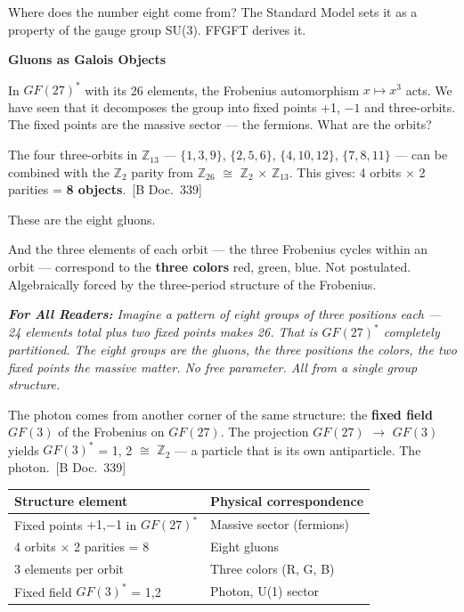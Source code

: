 \documentclass[11pt,oneside]{book}
\newcommand{\status}[1]{\penalty10000\,{\scriptsize\textcolor{gray!60}{[#1]}}}
\newenvironment{laierspur}{%
  \par\vspace{4pt}%
  \noindent\small\itshape\color{blue!60!black}%
  \textbf{For All Readers:}\enspace\ignorespaces}{%
  \par\vspace{4pt}\normalsize\normalfont\normalcolor}
\begin{document}
Where does the number eight come from? The Standard Model sets it as a
property of the gauge group SU(3). FFGFT derives it.

\textbf{Gluons as Galois Objects}

In $GF(27)^*$ with its 26 elements, the Frobenius automorphism $x \mapsto x^3$ acts.
We have seen that it decomposes the group into fixed points {+1, $-1$} and
three-orbits. The fixed points are the massive sector — the fermions. What
are the orbits?

The four three-orbits in $\mathbb{Z}_{13}$ — $\{1,3,9\}$, $\{2,5,6\}$, $\{4,10,12\}$, $\{7,8,11\}$
— can be combined with the $\mathbb{Z}_2$ parity from $\mathbb{Z}_{26}$ $\cong$ $\mathbb{Z}_2$ $\times$ $\mathbb{Z}_{13}$.
This gives: 4 orbits $\times$ 2 parities = \textbf{8 objects}. \status{B Doc.~339}

These are the eight gluons.

And the three elements of each orbit — the three Frobenius cycles within
an orbit — correspond to the \textbf{three colors} red, green, blue. Not
postulated. Algebraically forced by the three-period structure of the
Frobenius.

\begin{laierspur}
Imagine a pattern of eight groups of three positions each — 24 elements
total plus two fixed points makes 26. That is $GF(27)^*$ completely
partitioned. The eight groups are the gluons, the three positions the
colors, the two fixed points the massive matter. No free parameter. All from
a single group structure.
\end{laierspur}

The photon comes from another corner of the same structure: the \textbf{fixed
field $GF(3)$} of the Frobenius on $GF(27)$. The projection $GF(27)$ $\to$ $GF(3)$
yields $GF(3)^*$ = {1, 2} $\cong$ $\mathbb{Z}_2$ — a particle that is its own antiparticle.
The photon. \status{B Doc.~339}

\begin{center}
\small
\begin{tabular}{ll}
\toprule
Structure element & Physical correspondence \\
\midrule
Fixed points {+1,$-$1} in $GF(27)^*$ & Massive sector (fermions) \\
4 orbits $\times$ 2 parities = 8 & Eight gluons \\
3 elements per orbit & Three colors (R, G, B) \\
Fixed field $GF(3)^*$ = {1,2} & Photon, U(1) sector \\
\bottomrule
\end{tabular}
\end{center}
\end{document}
